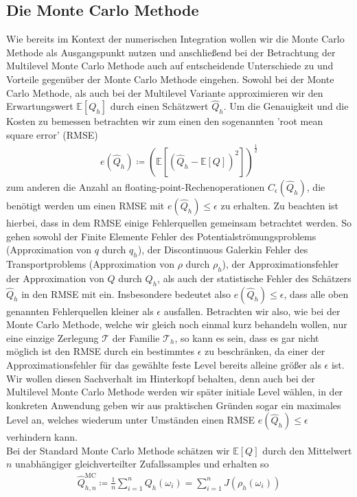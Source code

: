\subsection{Die Monte Carlo Methode}
Wie bereits im Kontext der numerischen Integration wollen wir die Monte Carlo Methode als Ausgangspunkt nutzen und anschließend bei der Betrachtung der Multilevel Monte Carlo Methode auch auf entscheidende Unterschiede zu und Vorteile gegenüber der Monte Carlo Methode eingehen.
Sowohl bei der Monte Carlo Methode, als auch bei der Multilevel Variante approximieren wir den Erwartungswert $ \mathbb{E}[Q_h] $ durch einen Schätzwert $ \widehat{Q}_h $. Um die Genauigkeit und die Kosten zu bemessen betrachten wir zum einen den sogenannten 'root mean square error' (RMSE) 
\begin{align}
	\label{RMSE}
	e( \widehat{Q}_h) \coloneqq \left(  \mathbb{E} \left[ (\widehat{Q}_h - \mathbb{E}[Q] )^2 \right] \right)^{\frac{1}{2}}
\end{align}
zum anderen die Anzahl an floating-point-Rechenoperationen $ C_{\epsilon}(\widehat{Q}_h) $, die benötigt werden um einen RMSE mit $ e( \widehat{Q}_h) \leq \epsilon $ zu erhalten.
Zu beachten ist hierbei, dass in dem RMSE einige Fehlerquellen gemeinsam betrachtet werden. So gehen sowohl der Finite Elemente Fehler des Potentialströmungsproblems (Approximation von $ q $ durch $ q_h $), der Discontinuous Galerkin Fehler des Transportproblems (Approximation von $ \rho $ durch $ \rho_h $), der Approximationsfehler der Approximation von $ Q $ durch $ Q_h $, als auch der statistische Fehler des Schätzers $\widehat{Q}_h$ in den RMSE mit ein. Insbesondere bedeutet also $ e( \widehat{Q}_h) \leq \epsilon $, dass alle oben genannten Fehlerquellen kleiner als $ \epsilon $ ausfallen. Betrachten wir also, wie bei der Monte Carlo Methode, welche wir gleich noch einmal kurz behandeln wollen, nur eine einzige Zerlegung $ \mathcal{T} $ der Familie $ \mathcal{T}_h $, so kann es sein, dass es gar nicht möglich ist den RMSE durch ein bestimmtes $ \epsilon $ zu beschränken, da einer der Approximationsfehler für das gewählte feste Level bereits alleine größer als $ \epsilon $ ist. Wir wollen diesen Sachverhalt im Hinterkopf behalten, denn auch bei der Multilevel Monte Carlo  Methode werden wir später initiale Level wählen, in der konkreten Anwendung geben wir aus praktischen Gründen sogar ein maximales Level an, welches wiederum unter Umständen einen RMSE $ e( \widehat{Q}_h) \leq \epsilon $ verhindern kann.\\
Bei der Standard Monte Carlo Methode schätzen wir $ \mathbb{E}[Q] $ durch den Mittelwert  $ n $ unabhängiger gleichverteilter Zufallssamples und erhalten so 
\begin{align}
	\label{MC-Schätzer}
	\widehat{Q}_{h,n}^{\text{MC}} \coloneqq \frac{1}{n} \sum_{i=1}^{n} Q_h(\omega_i) = \sum_{i=1}^{n} J(\rho_h(\omega_i))
\end{align}






